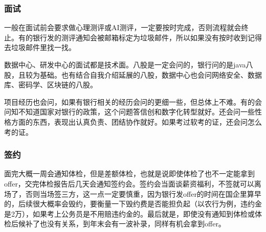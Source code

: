 \subsubsection{面试}
一般在面试前会要求做心理测评或AI测评，一定要按时完成，否则流程就会终止。有的银行发的测评通知会被邮箱标定为垃圾邮件，所以如果没有按时收到记得去垃圾邮件里找一找。

数据中心、研发中心的面试都是技术面。八股是一定会问的，银行问的是java八股，且较为基础。也有结合自我介绍延展的八股，数据中心也会问网络安全、数据库、密码学、区块链的八股。

项目经历也会问，如果有银行相关的经历会问的更细一些，但总体上不难。有的会问知不知道国家对银行的政策，这个问题答信创和数字化转型就好。还会问一些性格方面的东西，表现出认真负责、团结协作就好。如果考过软考的证，还会问怎么考的证。

\subsubsection{签约}
面完大概一周会通知体检，但是差额体检，也就是说即使体检了也不一定能拿到offer，交完体检报告后几天会通知签约会。签约会当面谈薪资福利，不签就可以离场了，否则当场签三方，这一点一定要慎重，因为银行发offer的时间在国企里算早的，后续很大概率会毁约，要衡量一下毁约费是否能担负起（以农行为例，违约金是2万），如果考上公务员是不用赔违约金的。最后就是，即使没有通知到体检或体检后候补了也没有关系，到年末会有一波补录，同样有机会拿到offer。






